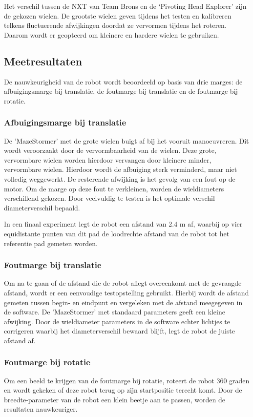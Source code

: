 \documentclass[tt1]{penoverslag}
\begin{document}
Het verschil tussen de NXT van Team Brons en de ‘Pivoting Head Explorer’ zijn de gekozen wielen. De grootste wielen geven tijdens het testen en kalibreren telkens fluctuerende afwijkingen doordat ze vervormen tijdens het roteren. Daarom wordt er geopteerd om kleinere en hardere wielen te gebruiken.

\subsection{Meetresultaten}
De nauwkeurigheid van de robot wordt beoordeeld op basis van drie marges: de afbuigingsmarge bij translatie, de foutmarge bij translatie en de foutmarge bij rotatie.

\subsubsection{Afbuigingsmarge bij translatie}
De 'MazeStormer' met de grote wielen buigt af bij het vooruit manoeuvreren. Dit wordt veroorzaakt door de vervormbaarheid van de wielen. Deze grote, vervormbare wielen worden hierdoor vervangen door kleinere minder, vervormbare wielen. Hierdoor wordt de afbuiging sterk verminderd, maar niet volledig weggewerkt. De resterende afwijking is het gevolg van een fout op de motor. Om de marge op deze fout te verkleinen, worden de wieldiameters verschillend gekozen. Door veelvuldig te testen is het optimale verschil diameterverschil bepaald.

In een finaal experiment legt de robot een afstand van 2.4 m af, waarbij op vier equidistante punten van dit pad de loodrechte afstand van de robot tot het referentie pad gemeten worden. %

\subsubsection{Foutmarge bij translatie}
Om na te gaan of de afstand die de robot aflegt overeenkomt met de gevraagde afstand, wordt er een eenvoudige testopstelling gebruikt. Hierbij wordt de afstand gemeten tussen begin- en eindpunt en vergeleken met de afstand meegegeven in de software. De 'MazeStormer' met standaard parameters geeft een kleine afwijking. Door de wieldiameter parameters  in de software echter lichtjes te corrigeren waarbij het diameterverschil bewaard blijft, legt de robot de juiste afstand af.

\subsubsection{Foutmarge bij rotatie}
Om een beeld te krijgen van de foutmarge bij rotatie, roteert de robot 360 graden en wordt gekeken of deze robot terug op zijn startpositie terecht komt. Door de breedte-parameter van de robot een klein beetje aan te passen, worden de resultaten nauwkeuriger. 
\end{document}
